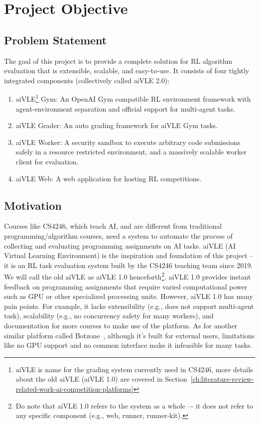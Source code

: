 \chapter{Project Objective}
\label{ch:project-objective}
\section{Problem Statement}
\label{s:project-objective-problem-statement}
The goal of this project is to provide a complete solution for RL algorithm evaluation that is extensible, scalable, and easy-to-use. It consists of four tightly integrated components (collectively called aiVLE 2.0):

\begin{enumerate}
    \item aiVLE\footnote{aiVLE is name for the grading system currently used in CS4246, more details about the old aiVLE (aiVLE 1.0) are covered in Section~\ref{ch:literature-review-related-work-ai-competition-platforms}} Gym: An OpenAI Gym \cite{openai-gym} compatible RL environment framework with agent-environment separation and official support for multi-agent tasks.
    \item aiVLE Grader: An auto grading framework for aiVLE Gym tasks.
    \item aiVLE Worker: A security sandbox to execute arbitrary code submissions safely in a resource restricted environment, and a massively scalable worker client for evaluation.
    \item aiVLE Web: A web application for hosting RL competitions.
\end{enumerate}

\section{Motivation}
\label{s:project-objective-motivation}
Courses like CS4246, which teach AI, and are different from traditional programming/algorithm courses, need a system to automate the process of collecting and evaluating programming assignments on AI tasks. aiVLE (AI Virtual Learning Environment) is the inspiration and foundation of this project – it is an RL task evaluation system built by the CS4246 teaching team since 2019. We will call the old aiVLE as aiVLE 1.0 henceforth\footnote{Do note that aiVLE 1.0 refers to the system as a whole –- it does not refer to any specific component (e.g., web, runner, runner-kit).}. aiVLE 1.0 provides instant feedback on programming assignments that require varied computational power such as GPU or other specialized processing units. However, aiVLE 1.0 has many pain points. For example, it lacks extensibility (e.g., does not support multi-agent task), scalability (e.g., no concurrency safety for many workers), and documentation for more courses to make use of the platform. As for another similar platform called Botzone~\cite{botzone}, although it’s built for external users, limitations like no GPU support and no common interface make it infeasible for many tasks.

